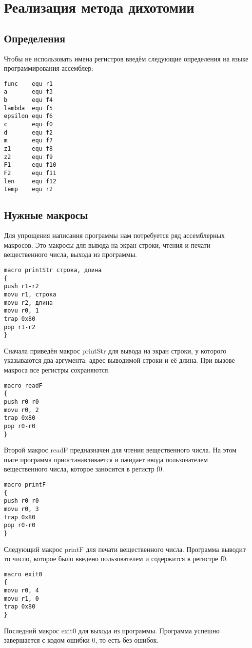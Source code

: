 \documentclass[14pt]{report}
\begin{document}
\chapter{Реализация метода дихотомии}
\section{Определения}
Чтобы не использовать имена регистров введём следующие определения на языке программирования ассемблер:
\begin{verbatim}
func    equ r1
a       equ f3
b       equ f4
lambda  equ f5
epsilon equ f6
c       equ f0
d       equ f2
m       equ f7
z1      equ f8
z2      equ f9
F1      equ f10
F2      equ f11
len     equ f12
temp    equ r2
\end{verbatim}

\section{Нужные макросы}
Для упрощения написания программы нам потребуется ряд ассемблерных макросов. Это макросы для вывода на экран строки, чтения и печати вещественного числа, выхода из программы.
\begin{verbatim}
macro printStr строка, длина
{
push r1-r2
movu r1, строка
movu r2, длина
movu r0, 1
trap 0x80
pop r1-r2
}
\end{verbatim}
\par
Сначала приведён макрос printStr для вывода на экран строки, у которого указываются два аргумента: адрес выводимой строки и её длина. При вызове макроса все регистры сохраняются.
\begin{verbatim}   
macro readF
{
push r0-r0
movu r0, 2
trap 0x80
pop r0-r0
}
\end{verbatim}
\par
Второй макрос readF предназначен для чтения вещественного числа. На этом шаге программа приостанавливается и ожидает ввода пользователем вещественного числа, которое заносится в регистр f0.
\begin{verbatim} 
macro printF
{
push r0-r0
movu r0, 3
trap 0x80
pop r0-r0
}
\end{verbatim}
\par
Следующий макрос printF для печати вещественного числа. Программа выводит то число, которое было введено пользователем и содержится в регистре f0.
\begin{verbatim} 
macro exit0
{
movu r0, 4
movu r1, 0
trap 0x80
}
\end{verbatim}
\par
Последний макрос exit0 для выхода из программы. Программа успешно завершается с кодом ошибки 0, то есть без ошибок.
\end{document}
